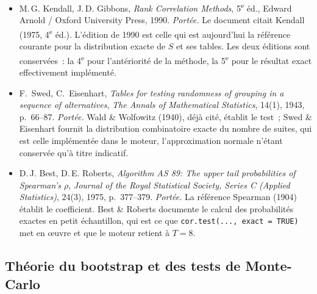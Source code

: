 \documentclass[a4paper,11pt]{article}
\newcommand{\code}[1]{\texttt{\small #1}}
\begin{document}
\begin{itemize}[itemsep=4pt]
  \item M.\,G. Kendall, J.\,D. Gibbons, \emph{Rank Correlation Methods},
  5\textsuperscript{e} éd., Edward Arnold / Oxford University Press, 1990.
  \emph{Portée.} Le document citait Kendall (1975,
  4\textsuperscript{e} éd.). L'édition de 1990 est celle qui est aujourd'hui
  la référence courante pour la distribution exacte de $S$ et ses tables. Les
  deux éditions sont conservées~: la 4\textsuperscript{e} pour l'antériorité de
  la méthode, la 5\textsuperscript{e} pour le résultat exact effectivement
  implémenté.

  \item F.~Swed, C.~Eisenhart, \emph{Tables for testing randomness of grouping
  in a sequence of alternatives}, \emph{The Annals of Mathematical Statistics},
  14(1), 1943, p.~66--87.
  \emph{Portée.} Wald \& Wolfowitz (1940), déjà cité, établit le
  test~; Swed \& Eisenhart fournit la distribution combinatoire exacte du
  nombre de suites, qui est celle implémentée dans le moteur, l'approximation
  normale n'étant conservée qu'à titre indicatif.

  \item D.\,J. Best, D.\,E. Roberts, \emph{Algorithm AS 89: The upper tail
  probabilities of Spearman's $\rho$}, \emph{Journal of the Royal Statistical
  Society, Series C (Applied Statistics)}, 24(3), 1975, p.~377--379.
  \emph{Portée.} La référence Spearman (1904) établit le
  coefficient. Best \& Roberts documente le calcul des probabilités exactes en
  petit échantillon, qui est ce que \code{cor.test(..., exact = TRUE)} met en
  \oe uvre et que le moteur retient à $T = 8$.
\end{itemize}

\subsection*{Théorie du bootstrap et des tests de Monte-Carlo}
\end{document}
